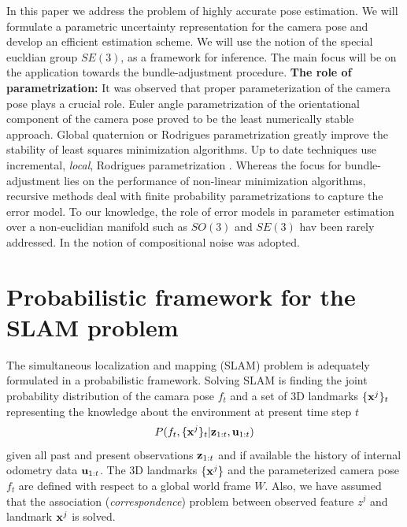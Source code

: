 \documentclass[conference]{IEEEtran}
\newcommand{\beq}{\begin{equation}}
\newcommand{\eeq}{\end{equation}}
\begin{document}
In this paper we address the problem of highly accurate pose estimation. We will formulate a parametric
uncertainty representation for the camera pose and develop an efficient estimation scheme. We will use
the notion of the special eucldian group $SE(3)$, as a framework for inference.
The main focus will be on the application towards the bundle-adjustment procedure. 
{\bf The role of parametrization:}
It was observed that proper parameterization of the camera pose plays a crucial role.
Euler angle parametrization of the orientational component of the camera pose proved to be the least
numerically stable approach. Global quaternion or Rodrigues parametrization greatly improve the stability of
least squares minimization algorithms. Up to date techniques use incremental, {\em local}, Rodrigues
parametrization \cite{triggs-bundle}.  Whereas the focus for bundle-adjustment lies on the performance
of non-linear minimization algorithms, recursive methods deal with finite probability parametrizations to
capture the error model. To our knowledge, the role of error models in parameter estimation over a non-euclidian manifold 
such as $SO(3)$ and $SE(3)$ hav been rarely addressed. In \cite{pennec97} the notion of compositional noise
was adopted.

\section{Probabilistic framework for the SLAM problem}
The simultaneous localization and mapping (SLAM) problem is adequately formulated in a probabilistic framework. Solving SLAM is
finding the joint probability distribution of the camara pose $f_t$ and a set of 3D landmarks $\{{\bf x}^j\}_t$ representing the knowledge about the environment at present time step $t$
\beq
    P(f_t,\{{\bf x}^j\}_t| {\bf z}_{1:t},{\bf u}_{1:t}) \label{eq:masterSLAMprob}
\eeq
given all past and present observations ${\bf z}_{1:t}$ and if available the history
of internal odometry data ${\bf u}_{1:t}$.
The 3D landmarks $\{{\bf x}^j\}$ and the parameterized camera pose $f_t$ are defined
with respect to a global world frame $W$. Also, we have assumed that the association
({\em correspondence}) problem
between observed feature $z^j$ and landmark ${\bf x}^j$ is solved.
\end{document}
